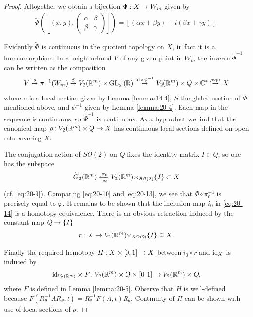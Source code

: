 \begin{proof}
  Altogether we obtain a bijection $\Phi  : X \rightarrow  {W}_{m}$ given by
  \begin{align}\label{eq:20-13}
    \widetilde{\Phi}\left(\left[(x, y), \begin{pmatrix}\alpha & \beta\\ \beta & \gamma\end{pmatrix}\right] \right)  
    = [ (\alpha x + \beta y) - i(\beta x + \gamma y)] .
  \end{align}
  
  Evidently $\widetilde{\Phi }$ is continuous in the quotient topology on $X$, in fact it is a homeomorphism. 
  In a neighborhood $V$ of any given point in ${W}_{m}$ the inverse ${\widetilde{\Phi }}^{-1}$ can be 
  written as the composition
  \[
    V\overset{s}
    { \rightarrow  }{\pi }^{-1}( {W}_{m}) \overset{S}
    { \rightarrow  }{V}_{2}( {{\mathbb{R}}^m})  \times  {\ensuremath{\mathrm{GL}}_2^+}( \mathbb{R}) 
    \overset{\mathrm{{id}} \times  {\psi }^{-1}}
    { \rightarrow  }{V}_{2}( {{\mathbb{R}}^m})  \times  Q \times  {\ensuremath{\mathbb{C}}}^*
    \overset{\rho\circ \text{pr}}
    { \rightarrow  }X
  \]
  where $s$ is a local section given by Lemma \ref{lemma:14-4}, $S$ the global section of $\Phi$ mentioned above, 
  and ${\psi }^{-1}$ given by Lemma \ref{lemma:20-4}. Each map in the sequence is continuous, so ${\widetilde{\Phi }}^{-1}$ 
  is continuous. As a byproduct we find that the canonical map $\rho  : {V}_{2}( {{\mathbb{R}}^m})  \times  Q \rightarrow  X$ 
  has continuous local sections defined on open sets covering $X$.
  
  The conjugation action of ${SO}( 2)$ on $Q$ fixes the identity matrix $I \in  Q$, so one has the subspace
  \begin{align}\label{eq:20-14}
    \widetilde{G}_{2}( {\RR^m}) 
    \xla[\pi_0](\simee)
    {V}_{2}( {\RR^m}) { \times  }_{{SO}( 2) }\{ I\}  
    \subset  X
  \end{align}
  (cf. \eqref{eq:20-9}). Comparing \eqref{eq:20-10} and \eqref{eq:20-13}, we see that $\widetilde{\Phi } \circ  {\pi }_{0}^{-1}$ 
  is precisely equal to $\widetilde{\varphi }$. It remains to be shown that the inclusion map ${i}_{0}$ in \eqref{eq:20-14} is 
  a homotopy equivalence. There is an obvious retraction induced by the constant map $Q \rightarrow  \{ I\}$
  \[
    r: X \rightarrow  {V}_{2}( {{\mathbb{R}}^m}) { \times  }_{{SO}( 2) }\{ I\}  \subseteq  X.
  \]
  
  Finally the required homotopy $H : X \times  [  {0,1}]   \rightarrow  X$ between ${i}_{0} \circ  r$ and ${\mathrm{id}}_{X}$ is induced by
  \[
    {\mathrm{id}}_{{V}_{2}( {{\mathbb{R}}}^{m}) } \times  F\colon {V}_{2}( {{\mathbb{R}}}^{m})  \times  Q \times  [  {0,1}]   \rightarrow  {V}_{2}( {{\mathbb{R}}}^{m})  \times  Q,
  \]
  where $F$ is defined in Lemma \ref{lemma:20-5}. Observe that $H$ is well-defined 
  because $F( {{R}_{\theta }^{-1}A{R}_{\theta },t}) = {R}_{\theta }^{-1}F( {A,t}) {R}_{\theta }$. 
  Continuity of $H$ can be shown with use of local sections of $\rho$.
\end{proof}


